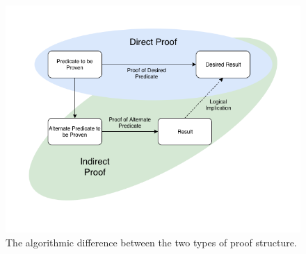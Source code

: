 \documentclass[../proofs.tex]{subfiles}
\begin{document}
\begin{figure}[h]
\centering
\includegraphics[scale=0.45]{res/direct_indirect.png}
\caption{The algorithmic difference between the two types of proof structure.}
\end{figure}
\end{document}
